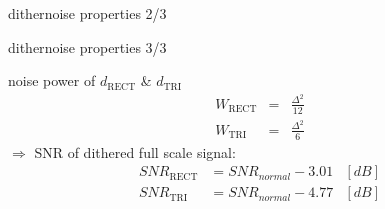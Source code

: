 	\begin{frame}{dither}{noise properties 2/3}
	\end{frame}	
	\begin{frame}{dither}{noise properties 3/3}
		
            
            noise power of $d_\mathrm{RECT}$ \& $d_\mathrm{TRI}$
            \begin{eqnarray*}
                W_\mathrm{RECT} &=& \frac{\Delta^2}{12}\\
                W_\mathrm{TRI} &=& \frac{\Delta^2}{6}
            \end{eqnarray*}
		\pause
		\bigskip
        $\Rightarrow$ SNR of dithered full scale signal:
		\begin{eqnarray*}
			SNR_\mathrm{RECT} 	&= SNR_{normal} - 3.01 &[dB] \\
			SNR_\mathrm{TRI} 	&= SNR_{normal} - 4.77 &[dB] 
		\end{eqnarray*}

	\end{frame}	
